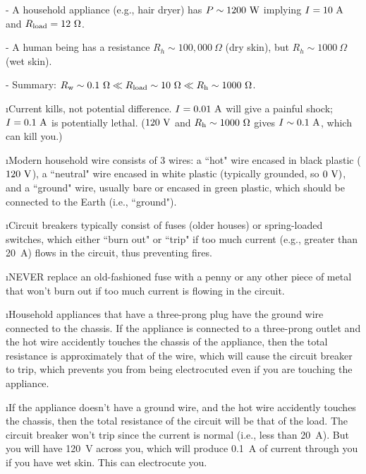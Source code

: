 - A household appliance (e.g., hair dryer) has 
$P\sim 1200~{\rm W}$ implying 
$I=10~{\rm A}$ and $R_{\rm load}=12~\Omega$.

- A human being has a resistance 
$R_h\sim 100,000~\Omega$ (dry skin),
but $R_h\sim 1000~\Omega$ (wet skin).

- Summary:
$R_{\rm w} \sim 0.1~\Omega \ll R_{\rm load} \sim 10~\Omega
\ll R_{\rm h}\sim 1000~\Omega$.

\i Current kills, not potential difference.
$I=0.01~{\rm A}$ will give a painful shock;
$I=0.1~{\rm A}$ is potentially lethal.
($120~{\rm V}$ and $R_{\rm h}\sim 1000~\Omega$
gives $I\sim 0.1~{\rm A}$, which can kill you.)

\i Modern household wire consists of 3 wires: 
a ``hot" wire encased in black plastic ($120~{\rm V}$), 
a ``neutral" wire encased in white
plastic (typically grounded, so $0~{\rm V})$, and a ``ground"
wire, usually bare or encased in green plastic, which should
be connected to the Earth (i.e., ``ground").

\i Circuit breakers typically consist of fuses (older houses)
or spring-loaded switches, which either ``burn out" or ``trip" 
if too much current (e.g., greater than 20~A) flows in the circuit,
thus preventing fires.

\i NEVER replace an old-fashioned fuse with a penny or
any other piece of metal that won't burn out if too much
current is flowing in the circuit.

\i Household appliances 
that have a three-prong plug have the ground wire connected 
to the chassis.
If the appliance is connected to a three-prong outlet and 
the hot wire accidently touches the chassis of the appliance, 
then the total
resistance is approximately that of the wire, which will cause
the circuit breaker to trip, which prevents you from being 
electrocuted even if you are touching the appliance.

\i If the appliance doesn't have a ground wire, and the hot
wire accidently touches the chassis, then the total resistance
of the circuit will be that of the load.
The circuit breaker won't trip since the current is normal
(i.e., less than 20~A).
But you will have 120~V across you, which will produce 0.1~A
of current through you if you have wet skin.
This can electrocute you.

\ei

